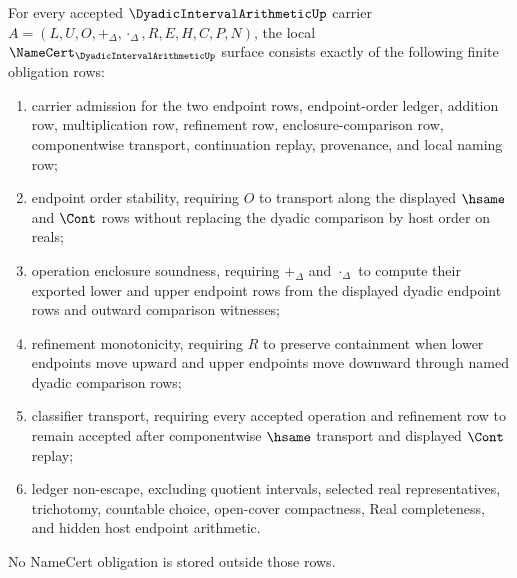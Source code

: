 \begin{theorem}
\label{thm:dyadic-interval-arithmetic-namecert-obligations}
For every accepted $\DyadicIntervalArithmeticUp$ carrier $A=(L,U,O,+_\Delta,\cdot_\Delta,R,E,H,C,P,N)$, the local $\NameCert_{\DyadicIntervalArithmeticUp}$ surface consists exactly of the following finite obligation rows:
\begin{enumerate}
\item carrier admission for the two endpoint rows, endpoint-order ledger, addition row, multiplication row, refinement row, enclosure-comparison row, componentwise transport, continuation replay, provenance, and local naming row;
\item endpoint order stability, requiring $O$ to transport along the displayed $\hsame$ and $\Cont$ rows without replacing the dyadic comparison by host order on reals;
\item operation enclosure soundness, requiring $+_\Delta$ and $\cdot_\Delta$ to compute their exported lower and upper endpoint rows from the displayed dyadic endpoint rows and outward comparison witnesses;
\item refinement monotonicity, requiring $R$ to preserve containment when lower endpoints move upward and upper endpoints move downward through named dyadic comparison rows;
\item classifier transport, requiring every accepted operation and refinement row to remain accepted after componentwise $\hsame$ transport and displayed $\Cont$ replay;
\item ledger non-escape, excluding quotient intervals, selected real representatives, trichotomy, countable choice, open-cover compactness, Real completeness, and hidden host endpoint arithmetic.
\end{enumerate}
No NameCert obligation is stored outside those rows.
\end{theorem}
